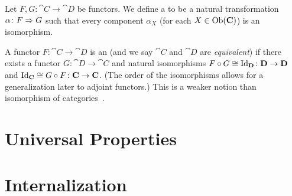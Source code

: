 \begin{node}
\begin{definition}\label{cat-001B}%
Let $F,G\colon\cat{C}\to\cat{D}$ be functors. We define a
 to be a natural transformation
$\alpha\colon F\Rightarrow G$ such that every component $\alpha_{X}$ (for
each $X\in\operatorname{Ob}(\mathbf{C})$) is an isomorphism.
\end{definition}

\begin{definition}\label{cat-001C}%
A functor $F\colon\cat{C}\to\cat{D}$ is an 
(and we say $\cat{C}$ and $\cat{D}$ are \textit{equivalent}) if there
exists a functor $G\colon\cat{D}\to\cat{C}$ and natural isomorphisms
$F\circ G\cong\operatorname{Id}_{\mathbf{D}}\colon\mathbf{D}\to\mathbf{D}$ and
$\operatorname{Id}_{\mathbf{C}}\cong G\circ F\colon\mathbf{C}\to\mathbf{C}$. (The order of the
isomorphisms allows for a generalization later to adjoint functors.)
This is a weaker notion than isomorphism of categories~.
\end{definition}

\end{node}

\section{Universal Properties}

\section{Internalization}

